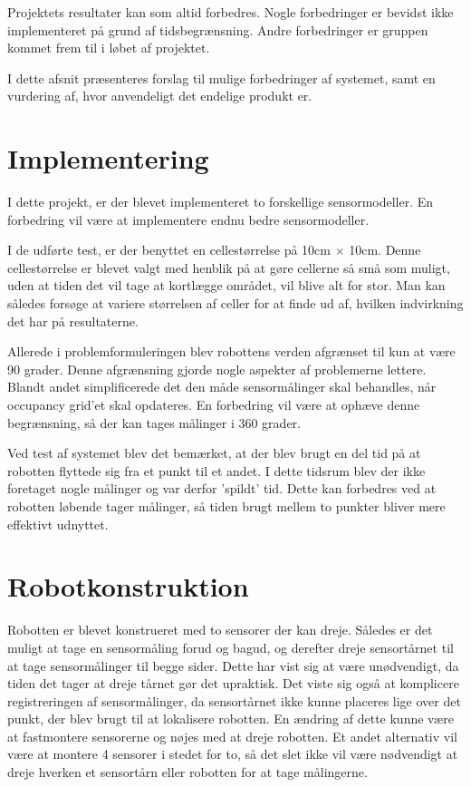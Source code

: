 Projektets resultater kan som altid forbedres.
Nogle forbedringer er bevidst ikke implementeret på grund af tidsbegrænsning. 
Andre forbedringer er gruppen kommet frem til i løbet af projektet.

I dette afsnit præsenteres forslag til mulige forbedringer af systemet, samt en vurdering af, hvor anvendeligt det endelige produkt er.

\section{Implementering}
I dette projekt, er der blevet implementeret to forskellige sensormodeller. 
En forbedring vil være at implementere endnu bedre sensormodeller.

I de udførte test, er der benyttet en cellestørrelse på 10cm $ \times $ 10cm.
Denne cellestørrelse er blevet valgt med henblik på at gøre cellerne så små som muligt, uden at tiden det vil tage at kortlægge området, vil blive alt for stor.
Man kan således forsøge at variere størrelsen af celler for at finde ud af, hvilken indvirkning det har på resultaterne.

Allerede i problemformuleringen blev robottens verden afgrænset til kun at være 90 grader. 
Denne afgrænsning gjorde nogle aspekter af problemerne lettere. 
Blandt andet simplificerede det den måde sensormålinger skal behandles, når occupancy grid'et skal opdateres.
En forbedring vil være at ophæve denne begrænsning, så der kan tages målinger i 360 grader.

Ved test af systemet blev det bemærket, at der blev brugt en del tid på at robotten flyttede sig fra et punkt til et andet.
I dette tidsrum blev der ikke foretaget nogle målinger og var derfor 'spildt' tid. 
Dette kan forbedres ved at robotten løbende tager målinger, så tiden brugt mellem to punkter bliver mere effektivt udnyttet.

\section{Robotkonstruktion}
Robotten er blevet konstrueret med to sensorer der kan dreje. 
Således er det muligt at tage en sensormåling forud og bagud, og derefter dreje sensortårnet til at tage sensormålinger til begge sider.
Dette har vist sig at være unødvendigt, da tiden det tager at dreje tårnet gør det upraktisk.
Det viste sig også at komplicere registreringen af sensormålinger, da sensortårnet ikke kunne placeres lige over det punkt, der blev brugt til at lokalisere robotten.
En ændring af dette kunne være at fastmontere sensorerne og nøjes med at dreje robotten.
Et andet alternativ vil være at montere 4 sensorer i stedet for to, så det slet ikke vil være nødvendigt at dreje hverken et sensortårn eller robotten for at tage målingerne.

